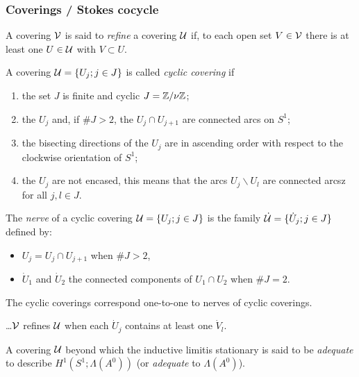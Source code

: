 \subsubsection{Coverings / Stokes cocycle}
\begin{comment}
  \begin{itemize}
    \item \cite{Loday1994} Section II.1
    \item \cite{Loday1994} Section II.3.1
  \end{itemize}
\end{comment}
A covering $\mathcal{V}$ is said to \emph{refine} a covering $\mathcal{U}$ if, to each open set
$V\in\mathcal{V}$ there is at least one $U\in\mathcal{U}$ with $V\subset U$.
\begin{defn}
  A covering $\mathcal{U}=\{U_j;j\in J\}$ is called \emph{cyclic covering} if
  \begin{enumerate}
    \item the set $J$ is finite and cyclic $J=\mathbb{Z}/\nu\mathbb{Z}$;
    \item the $U_j$ and, if $\#J>2$, the $U_j\cap U_{j+1}$ are connected arcs on
      $S^1$;
    \item the bisecting directions of the $U_j$ are in ascending order with
      respect to the clockwise orientation of $S^1$;
    \item the $U_j$ are not encased, this means that the arcs
      $U_j\backslash U_l$ are connected arcsz for all $j,l\in J$.
  \end{enumerate}
\end{defn}
\begin{defn}
  The \emph{nerve} of a cyclic covering $\mathcal{U}=\{U_j;j\in J\}$ is the family
  $\dot{\mathcal{U}}=\{\dot U_j;j\in J\}$ defined by:
  \begin{itemize}
    \item $U_j=U_j\cap U_{j+1}$ when $\#J>2$,
    \item $\dot U_1$ and $\dot U_2$ the connected components of $U_1\cap U_2$
      when $\#J=2$.
  \end{itemize}
\end{defn}
The cyclic coverings correspond one-to-one to nerves of cyclic coverings.
\begin{prop}
  \dots $\mathcal{V}$ refines $\mathcal{U}$ when each $\dot U_j$ contains at least one
  $\dot V_l$.
\end{prop}

\begin{defn}
  A covering $\mathcal{U}$ beyond which the inductive limit\TODO[which] is stationary
  is said to be \emph{adequate} to describe $H^1(S^1;\Lambda(A^0))$ (or
  \emph{adequate} to $\Lambda(A^0)$).
\end{defn}

